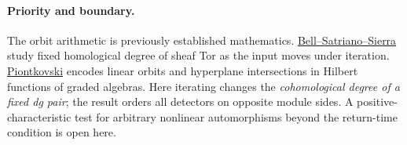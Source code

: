 \documentclass[11pt]{article}
\begin{document}
\paragraph{Priority and boundary.}
The orbit arithmetic is previously established mathematics.
\href{https://arxiv.org/abs/1611.05885}{Bell--Satriano--Sierra}
study fixed homological degree of sheaf Tor as the input moves under
iteration. \href{https://arxiv.org/abs/1706.06470}{Piontkovski}
encodes linear orbits and hyperplane intersections in Hilbert functions
of graded algebras. Here iterating changes the \emph{cohomological
degree of a fixed dg pair}; the result orders all detectors on opposite
module sides. A positive-characteristic test for arbitrary nonlinear
automorphisms beyond the return-time condition is open here.
\end{document}
